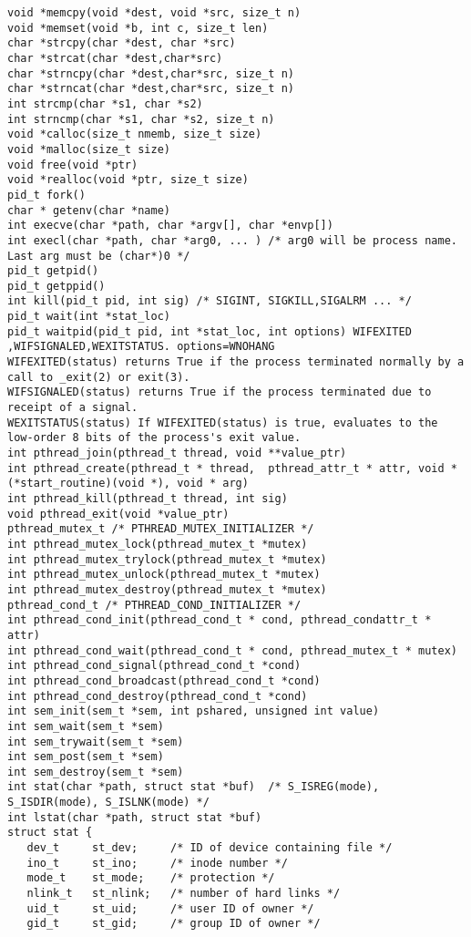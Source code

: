 \begin{verbatim}
void *memcpy(void *dest, void *src, size_t n)
void *memset(void *b, int c, size_t len)
char *strcpy(char *dest, char *src)
char *strcat(char *dest,char*src)
char *strncpy(char *dest,char*src, size_t n)
char *strncat(char *dest,char*src, size_t n)
int strcmp(char *s1, char *s2)
int strncmp(char *s1, char *s2, size_t n)
void *calloc(size_t nmemb, size_t size)
void *malloc(size_t size)
void free(void *ptr)
void *realloc(void *ptr, size_t size)
pid_t fork()
char * getenv(char *name)
int execve(char *path, char *argv[], char *envp[])
int execl(char *path, char *arg0, ... ) /* arg0 will be process name. Last arg must be (char*)0 */
pid_t getpid()
pid_t getppid()
int kill(pid_t pid, int sig) /* SIGINT, SIGKILL,SIGALRM ... */
pid_t wait(int *stat_loc)
pid_t waitpid(pid_t pid, int *stat_loc, int options) WIFEXITED ,WIFSIGNALED,WEXITSTATUS. options=WNOHANG
WIFEXITED(status) returns True if the process terminated normally by a call to _exit(2) or exit(3).
WIFSIGNALED(status) returns True if the process terminated due to receipt of a signal.
WEXITSTATUS(status) If WIFEXITED(status) is true, evaluates to the low-order 8 bits of the process's exit value.
int pthread_join(pthread_t thread, void **value_ptr)
int pthread_create(pthread_t * thread,  pthread_attr_t * attr, void *(*start_routine)(void *), void * arg)
int pthread_kill(pthread_t thread, int sig)
void pthread_exit(void *value_ptr)
pthread_mutex_t /* PTHREAD_MUTEX_INITIALIZER */
int pthread_mutex_lock(pthread_mutex_t *mutex)
int pthread_mutex_trylock(pthread_mutex_t *mutex)
int pthread_mutex_unlock(pthread_mutex_t *mutex)
int pthread_mutex_destroy(pthread_mutex_t *mutex)
pthread_cond_t /* PTHREAD_COND_INITIALIZER */
int pthread_cond_init(pthread_cond_t * cond, pthread_condattr_t * attr)
int pthread_cond_wait(pthread_cond_t * cond, pthread_mutex_t * mutex)
int pthread_cond_signal(pthread_cond_t *cond)
int pthread_cond_broadcast(pthread_cond_t *cond)
int pthread_cond_destroy(pthread_cond_t *cond)
int sem_init(sem_t *sem, int pshared, unsigned int value)
int sem_wait(sem_t *sem)
int sem_trywait(sem_t *sem)
int sem_post(sem_t *sem)
int sem_destroy(sem_t *sem)
int stat(char *path, struct stat *buf)  /* S_ISREG(mode), S_ISDIR(mode), S_ISLNK(mode) */
int lstat(char *path, struct stat *buf)
struct stat {
   dev_t     st_dev;     /* ID of device containing file */
   ino_t     st_ino;     /* inode number */
   mode_t    st_mode;    /* protection */
   nlink_t   st_nlink;   /* number of hard links */
   uid_t     st_uid;     /* user ID of owner */
   gid_t     st_gid;     /* group ID of owner */

\end{verbatim}
